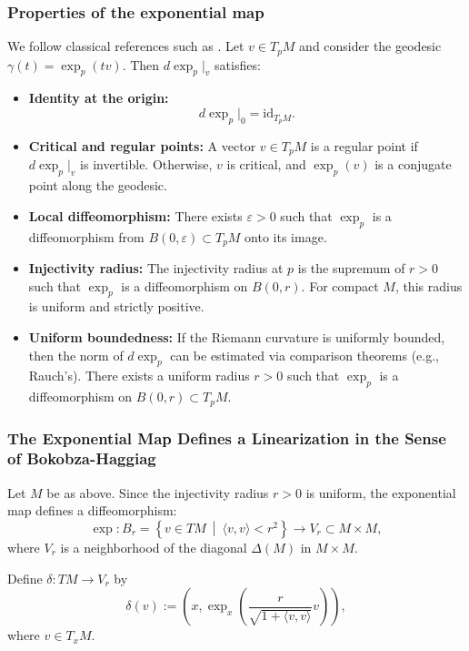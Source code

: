 \documentclass{amsart}
\newcounter{ex}
\newcounter{re}
\begin{document}
\subsubsection{Properties of the exponential map}

We follow classical references such as \cite{Ber2003, GHL2004}. Let $v \in T_p M$ and consider the geodesic $\gamma(t) = \exp_p(tv)$. Then $d\exp_p|_v$ satisfies:

\begin{itemize}
	\item \textbf{Identity at the origin:}
	\[
	d\exp_p|_{0} = \mathrm{id}_{T_p M}.
	\]
	
	\item \textbf{Critical and regular points:} A vector $v \in T_p M$ is a regular point if $d\exp_p|_v$ is invertible. Otherwise, $v$ is critical, and $\exp_p(v)$ is a conjugate point along the geodesic.
	
	\item \textbf{Local diffeomorphism:} There exists $\varepsilon > 0$ such that $\exp_p$ is a diffeomorphism from $B(0,\varepsilon) \subset T_p M$ onto its image.
	
	\item \textbf{Injectivity radius:} The injectivity radius at $p$ is the supremum of $r > 0$ such that $\exp_p$ is a diffeomorphism on $B(0,r)$. For compact $M$, this radius is uniform and strictly positive.
	
	\item \textbf{Uniform boundedness:} If the Riemann curvature is uniformly bounded, then the norm of $d\exp_p$ can be estimated via comparison theorems (e.g., Rauch’s). There exists a uniform radius $r > 0$ such that $\exp_p$ is a diffeomorphism on $B(0, r) \subset T_p M$.
\end{itemize}

\subsubsection{The Exponential Map Defines a Linearization in the Sense of Bokobza-Haggiag} \label{ss:man}

Let $M$ be as above. Since the injectivity radius $r > 0$ is uniform, the exponential map defines a diffeomorphism:
\[
\exp: B_r = \left\{ v \in TM \ \middle| \ \langle v, v \rangle < r^2 \right\} \to V_r \subset M \times M,
\]
where $V_r$ is a neighborhood of the diagonal $\Delta(M)$ in $M \times M$.

Define $\delta: TM \to V_r$ by
\[
\delta(v) := \left(x, \exp_x \left( \frac{r}{\sqrt{1 + \langle v,v \rangle}} v \right)\right),
\]
where $v \in T_x M$.
\end{document}
